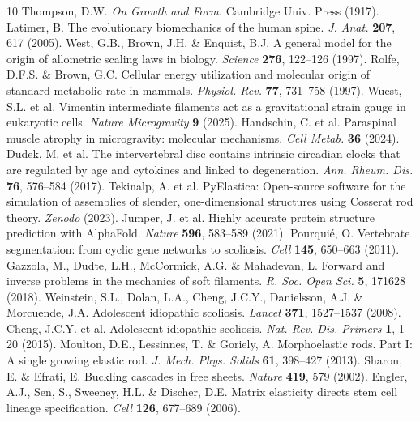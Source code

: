 \documentclass[12pt]{article}
\begin{document}
\begin{thebibliography}{10}
 Thompson, D.W. \textit{On Growth and Form}. Cambridge Univ. Press (1917).
 Latimer, B. The evolutionary biomechanics of the human spine. \textit{J. Anat.} \textbf{207}, 617 (2005).
 West, G.B., Brown, J.H. \& Enquist, B.J. A general model for the origin of allometric scaling laws in biology. \textit{Science} \textbf{276}, 122–126 (1997).
 Rolfe, D.F.S. \& Brown, G.C. Cellular energy utilization and molecular origin of standard metabolic rate in mammals. \textit{Physiol. Rev.} \textbf{77}, 731–758 (1997).
 Wuest, S.L. et al. Vimentin intermediate filaments act as a gravitational strain gauge in eukaryotic cells. \textit{Nature Microgravity} \textbf{9} (2025).
 Handschin, C. et al. Paraspinal muscle atrophy in microgravity: molecular mechanisms. \textit{Cell Metab.} \textbf{36} (2024).
 Dudek, M. et al. The intervertebral disc contains intrinsic circadian clocks that are regulated by age and cytokines and linked to degeneration. \textit{Ann. Rheum. Dis.} \textbf{76}, 576–584 (2017).
 Tekinalp, A. et al. PyElastica: Open-source software for the simulation of assemblies of slender, one-dimensional structures using Cosserat rod theory. \textit{Zenodo} (2023).
 Jumper, J. et al. Highly accurate protein structure prediction with AlphaFold. \textit{Nature} \textbf{596}, 583–589 (2021).
 Pourquié, O. Vertebrate segmentation: from cyclic gene networks to scoliosis. \textit{Cell} \textbf{145}, 650–663 (2011).
 Gazzola, M., Dudte, L.H., McCormick, A.G. \& Mahadevan, L. Forward and inverse problems in the mechanics of soft filaments. \textit{R. Soc. Open Sci.} \textbf{5}, 171628 (2018).
 Weinstein, S.L., Dolan, L.A., Cheng, J.C.Y., Danielsson, A.J. \& Morcuende, J.A. Adolescent idiopathic scoliosis. \textit{Lancet} \textbf{371}, 1527–1537 (2008).
 Cheng, J.C.Y. et al. Adolescent idiopathic scoliosis. \textit{Nat. Rev. Dis. Primers} \textbf{1}, 1–20 (2015).
 Moulton, D.E., Lessinnes, T. \& Goriely, A. Morphoelastic rods. Part I: A single growing elastic rod. \textit{J. Mech. Phys. Solids} \textbf{61}, 398–427 (2013).
 Sharon, E. \& Efrati, E. Buckling cascades in free sheets. \textit{Nature} \textbf{419}, 579 (2002).
 Engler, A.J., Sen, S., Sweeney, H.L. \& Discher, D.E. Matrix elasticity directs stem cell lineage specification. \textit{Cell} \textbf{126}, 677–689 (2006).

\end{thebibliography}
\end{document}
